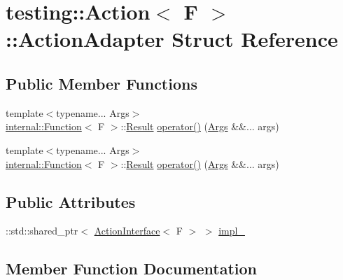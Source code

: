 \hypertarget{structtesting_1_1_action_1_1_action_adapter}{}\section{testing\+::Action$<$ F $>$\+::Action\+Adapter Struct Reference}
\label{structtesting_1_1_action_1_1_action_adapter}
\subsection*{Public Member Functions}
\begin{DoxyCompactItemize}
\item 
{\footnotesize template$<$typename... Args$>$ }\\\mbox{\hyperlink{structtesting_1_1internal_1_1_function}{internal\+::\+Function}}$<$ F $>$\+::\mbox{\hyperlink{classtesting_1_1_action_a9af08a21ad329331fde856cba9b6dea2}{Result}} \mbox{\hyperlink{structtesting_1_1_action_1_1_action_adapter_ab42ccaf9b44b9806303a78db1043c4cb}{operator()}} (\mbox{\hyperlink{namespacetesting_aaca153f67b689b8b9d5b8c67ecf8cee4}{Args}} \&\&... args)
\item 
{\footnotesize template$<$typename... Args$>$ }\\\mbox{\hyperlink{structtesting_1_1internal_1_1_function}{internal\+::\+Function}}$<$ F $>$\+::\mbox{\hyperlink{classtesting_1_1_action_a9af08a21ad329331fde856cba9b6dea2}{Result}} \mbox{\hyperlink{structtesting_1_1_action_1_1_action_adapter_ab42ccaf9b44b9806303a78db1043c4cb}{operator()}} (\mbox{\hyperlink{namespacetesting_aaca153f67b689b8b9d5b8c67ecf8cee4}{Args}} \&\&... args)
\end{DoxyCompactItemize}
\subsection*{Public Attributes}
\begin{DoxyCompactItemize}
\item 
\+::std\+::shared\+\_\+ptr$<$ \mbox{\hyperlink{classtesting_1_1_action_interface}{Action\+Interface}}$<$ F $>$ $>$ \mbox{\hyperlink{structtesting_1_1_action_1_1_action_adapter_acb8dd3d9a9eaf172bae160082dd2a50e}{impl\+\_\+}}
\end{DoxyCompactItemize}


\subsection{Member Function Documentation}
\mbox{\label{structtesting_1_1_action_1_1_action_adapter_ab42ccaf9b44b9806303a78db1043c4cb}} 
